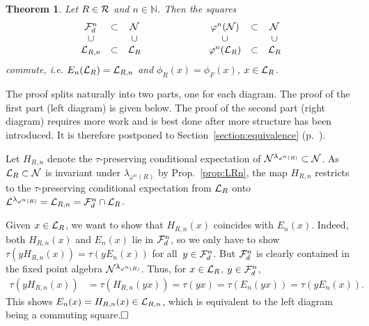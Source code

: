 \documentclass[12pt,a4paper]{amsart}
\numberwithin{equation}{section}
\newtheorem{theorem}{Theorem}[section]
\theoremstyle{remark}
\newcommand{\Nl}{\mathbb{N}}
\newcommand{\la}{\lambda}
\begin{document}
\begin{theorem}\label{thm:commuting-squares}
    Let $R\in\mathcal{R}$ and $n\in\Nl$. Then the squares 
    \begin{align}\label{eq:commutingsquare2}
        \begin{array}{ccc}
            \mathcal{F}_d^n &\subset &\mathcal{N}
            \\
            \cup & & \cup
            \\
            \mathcal{L}_{R,n} &\subset &\mathcal{L}_R
        \end{array}
        \qquad\qquad\qquad
        \begin{array}{ccc}
            \varphi^n(\mathcal{N}) &\subset &\mathcal{N}
            \\
            \cup & & \cup
            \\
            \varphi^n(\mathcal{L}_R) &\subset &\mathcal{L}_R
        \end{array}
    \end{align}
    commute, i.e. $E_n(\mathcal{L}_R)=\mathcal{L}_{R,n}$ and $\phi_R(x)=\phi_F(x)$, $x\in\mathcal{L}_R$.
\end{theorem}

The proof splits naturally into two parts, one for each diagram. The proof of the first part (left diagram) is given below. The proof of the second part (right diagram) requires more work and is best done after more structure has been introduced. It is therefore postponed to Section~\ref{section:equivalence} (p.~\pageref{page:proofpart2}).

\medskip

	Let $H_{R,n}$ denote the $\tau$-preserving conditional expectation of $\CN^{\la_{\varphi^n(R)}}\subset\CN$. As $\mathcal{L}_R\subset\mathcal{N}$ is invariant under $\la_{\varphi^n(R)}$ by Prop.~\ref{prop:LRn}, the map $H_{R,n}$ restricts to the $\tau$-preserving conditional expectation from $\mathcal{L}_R$ onto $\CL^{\la_{\varphi^n(R)}}=\CL_{R,n}=\CF^n_d\cap\CL_R$.
    
    Given $x\in\mathcal{L}_R$, we want to show that $H_{R,n}(x)$ coincides with $E_n(x)$. Indeed, both $H_{R,n}(x)$ and $E_n(x)$ lie in $\mathcal{F}_d^n$, so we only have to show $\tau(yH_{R,n}(x))=\tau(yE_n(x))$ for all~$y\in\mathcal{F}_d^n$. But $\mathcal{F}_d^n$ is clearly contained in the fixed point algebra $\CN^{\la_{\varphi^n(R)}}$. Thus, for $x\in\mathcal{L}_R$, $y\in\mathcal{F}_d^n$, 
    \begin{align*}
        \tau(yH_{R,n}(x))
        &=
        \tau(H_{R,n}(yx))
        =
        \tau(yx)
        =
        \tau(E_n(yx))
        =
        \tau(yE_n(x)).
    \end{align*}
    This shows $E_n(x)=H_{R,n}(x)\in\mathcal{L}_{R,n}$, which is equivalent to the left diagram being a commuting square.$\hfill\square$
    
\end{document}
